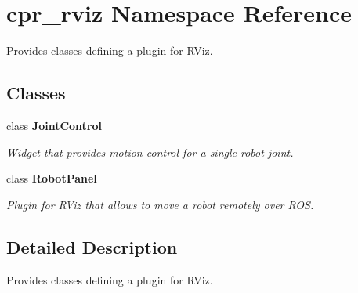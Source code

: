 \section{cpr\+\_\+rviz Namespace Reference}
\label{namespacecpr__rviz}


Provides classes defining a plugin for R\+Viz.  


\subsection*{Classes}
\begin{DoxyCompactItemize}
\item 
class \textbf{ Joint\+Control}
\begin{DoxyCompactList}\small\item\em Widget that provides motion control for a single robot joint. \end{DoxyCompactList}\item 
class \textbf{ Robot\+Panel}
\begin{DoxyCompactList}\small\item\em Plugin for R\+Viz that allows to move a robot remotely over R\+OS. \end{DoxyCompactList}\end{DoxyCompactItemize}


\subsection{Detailed Description}
Provides classes defining a plugin for R\+Viz. 